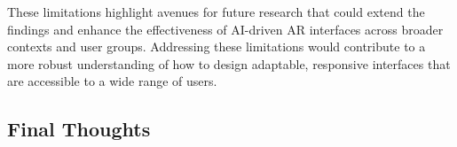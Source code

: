These limitations highlight avenues for future research that could extend the findings and enhance the effectiveness of AI-driven AR interfaces across broader contexts and user groups.
Addressing these limitations would contribute to a more robust understanding of how to design adaptable, responsive interfaces that are accessible to a wide range of users.

\subsection{Final Thoughts}





